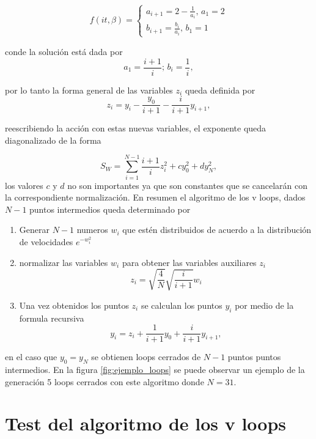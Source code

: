\[ 
f   ( i t ,\beta )=
\begin{cases} 
	  a_{i+1} = 2 - \frac{1}{a_i},  \, a _1 = 2
\\
	  	  b_{i+1} = \frac{b _i}{a _i},  \, b _1 = 1
   \end{cases}   
\] 

conde la solución está dada por
\begin{equation}
a _1 = \frac{i+1}{i} ; \, b_i = \frac{1}{i} ,
\end{equation}

por lo tanto la forma general de las variables $z _i$ queda definida por
\begin{equation}
z _i = y _i - \frac{y_0}{i+1} - \frac{i}{i+1} y _{i+1} ,
\end{equation}

reescribiendo la acción con estas nuevas variables, el exponente queda diagonalizado de la forma

\begin{equation}
S _{W}  = \sum _{i = 1} ^{N-1} \frac{i +1}{i} z _i ^2 + c y _0 ^2 + d y _N ^2
, 
\end{equation}
los valores $c$ y $d$ no son importantes ya que son constantes que se cancelarán con la correspondiente normalización.
En resumen el algoritmo de los v loops, dados $N-1$ puntos intermedios queda determinado por 
\begin{enumerate}
\item Generar $N-1$ numeros $w_i$ que estén distribuidos de acuerdo a la distribución de velocidades $e^{- w _{i} ^2}$
\item normalizar las variables $w _i$ para obtener las variables auxiliares $z _i$
	\begin{equation}
	z _i = \sqrt{\frac{4}{N}} \sqrt{\frac{i}{i+1}} w _i
	\end{equation}

\item Una vez obtenidos los puntos $ z_i$ se calculan los puntos $ y_i$ por medio de la formula recursiva
	\begin{equation}
	y _i = z _i + \frac{1}{i+1} y_0 + \frac{i}{i+1} y _{i+1} ,
	\end{equation}
\end{enumerate}
en el caso que $y_0 = y _N$ se obtienen loops cerrados de $N-1$ puntos puntos intermedios.
En la figura \ref{fig:ejemplo_loops} se puede observar un ejemplo de la generación 5 loops cerrados con este algoritmo donde $N=31$.


\section{Test del algoritmo de los v loops}


